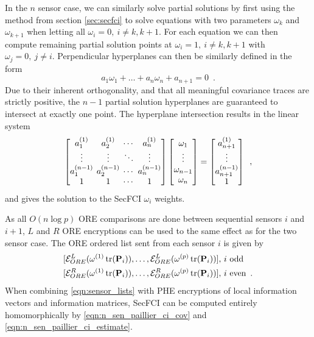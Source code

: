 \documentclass[letterpaper, 10 pt, journal, twoside]{ieeetran}  %
\begin{document}
In the $n$ sensor case, we can similarly solve partial solutions by first using the method from section \ref{sec:secfci} to solve equations with two parameters $\omega_k$ and $\omega_{k+1}$ when letting all $\omega_i=0,\ i\neq k,k+1$. For each equation we can then compute remaining partial solution points at $\omega_i=1,\ i\neq k,k+1$ with $\omega_j=0,\ j\neq i$. Perpendicular hyperplanes can then be similarly defined in the form 
\begin{equation}
   a_1\omega_1 + \dots +a_n\omega_n + a_{n+1} = 0\enspace. \label{eqn:nsen_plane_eq}
\end{equation}
Due to their inherent orthogonality, and that all meaningful covariance traces are strictly positive, the $n-1$ partial solution hyperplanes are guaranteed to intersect at exactly one point. The hyperplane intersection results in the linear system 
\begin{equation}
   \begingroup
   \setlength\arraycolsep{2pt}
   \begin{bmatrix}
      a_1^{(1)} & a_2^{(1)} & \cdots & a_{n}^{(1)} \\
      \vdots & \vdots & \ddots & \vdots \\
      a_1^{(n-1)} & a_2^{(n-1)} & \cdots & a_{n}^{(n-1)} \\
      1 & 1 & \cdots & 1
   \end{bmatrix}
   \begin{bmatrix}
      \omega_1 \\
      \vdots \\
      \omega_{n-1} \\
      \omega_{n}
   \end{bmatrix}
   =
   \begin{bmatrix}
      a_{n+1}^{(1)} \\
      \vdots \\
      a_{n+1}^{(n-1)} \\
      1
   \end{bmatrix}\enspace, \label{eqn:hyperplane_sol_eq}
   \endgroup
\end{equation}
and gives the solution to the SecFCI $\omega_i$ weights.

As all $O(n\log{p})$ ORE comparisons are done between sequential sensors $i$ and $i+1$, $L$ and $R$ ORE encryptions can be used to the same effect as for the two sensor case. The ORE ordered list sent from each sensor $i$ is given by
\begin{equation}
   \begin{aligned} \label{eqn:sensor_lists}
      &[\mathcal{E}^L_{ORE}(\omega^{(1)}\operatorname{tr}({{\mathbf{P}}}_i)),\dots,\mathcal{E}^L_{ORE}(\omega^{(p)}\operatorname{tr}({{\mathbf{P}}}_i))],\,i\text{ odd} \\
      &[\mathcal{E}^R_{ORE}(\omega^{(1)}\operatorname{tr}({{\mathbf{P}}}_i)),\dots,\mathcal{E}^R_{ORE}(\omega^{(p)}\operatorname{tr}({{\mathbf{P}}}_i))],\,i\text{ even}\enspace.
   \end{aligned}
\end{equation}
When combining \eqref{eqn:sensor_lists} with PHE encryptions of local information vectors and information matrices, SecFCI can be computed entirely homomorphically by \eqref{eqn:n_sen_paillier_ci_cov} and \eqref{eqn:n_sen_paillier_ci_estimate}.
\end{document}
